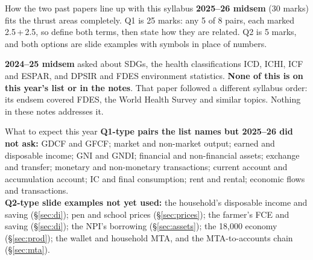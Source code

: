 \documentclass[11pt]{article}
\begin{document}
\begin{pyqbox}{How the two past papers line up with this syllabus}
\small
\textbf{2025--26 midsem} (30 marks) fits the thrust areas completely. Q1 is 25 marks: any 5 of 8
pairs, each marked 2.5\,+\,2.5, so define both terms, then state how they are related. Q2 is 5
marks, and both options are slide examples with symbols in place of numbers.

\textbf{2024--25 midsem} asked about SDGs, the health classifications ICD, ICHI, ICF and ESPAR, and
DPSIR and FDES environment statistics. \textbf{None of this is on this year's list or in the notes}.
That paper followed a different syllabus order: its endsem covered FDES, the World Health Survey and
similar topics. Nothing in these notes addresses it.
\end{pyqbox}

\begin{pyqbox}{What to expect this year}
\small \textbf{Q1-type pairs the list names but 2025--26 did not ask:} GDCF and GFCF; market and
non-market output; earned and disposable income; GNI and GNDI; financial and non-financial assets;
exchange and transfer; monetary and non-monetary transactions; current account and accumulation
account; IC and final consumption; rent and rental; economic flows and transactions.\\[2pt]
\textbf{Q2-type slide examples not yet used:} the household's disposable income and saving
(\S\ref{sec:di}); pen and school prices (\S\ref{sec:prices}); the farmer's FCE and saving
(\S\ref{sec:di}); the NPI's borrowing (\S\ref{sec:assets}); the 18,000 economy (\S\ref{sec:prod});
the wallet and household MTA, and the MTA-to-accounts chain (\S\ref{sec:mta}).
\end{pyqbox}



\end{document}
